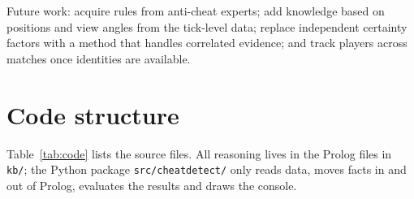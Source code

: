 \documentclass[11pt,a4paper]{article}
\newcommand{\code}[1]{\texttt{#1}}
\begin{document}
Future work: acquire rules from anti-cheat experts; add knowledge based on positions and view
angles from the tick-level data; replace independent certainty factors with a method that handles
correlated evidence; and track players across matches once identities are available.




\appendix
\section{Code structure}
\label{app:code}

Table~\ref{tab:code} lists the source files. All reasoning lives in the Prolog files in \code{kb/};
the Python package \code{src/cheatdetect/} only reads data, moves facts in and out of Prolog,
evaluates the results and draws the console.
\end{document}
